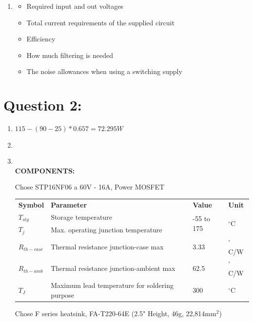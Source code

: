 \documentclass[11pt]{article}
\newcommand\Item[1][]{%
  \ifx\relax#1\relax  \item \else \item[#1] \fi
  \abovedisplayskip=0pt\abovedisplayshortskip=0pt~\vspace*{-\baselineskip}}
\begin{document}
\begin{preview}
\begin{enumerate}[label=\alph*)]
          \item \begin{itemize}
            \item Required input and out voltages
            \item Total current requirements of the supplied circuit
            \item Efficiency
            \item How much filtering is needed
            \item The noise allowances when using a switching supply 
          \end{itemize}
\end{enumerate}

\section*{Question 2:}
\begin{enumerate}[label=\alph*)]
          \item $115-(90-25)*0.657=72.295W$
          \Item \\ 
          \textbf{COMPONENTS:}

          Chose STP16NF06 a 60V - 16A, Power MOSFET\\
          \begin{tabular}{llll}
            \textbf{Symbol} & \textbf{Parameter}                                  & \textbf{Value}              & \textbf{Unit}              \\
            $T_{stg}$           & Storage temperature                             & \multirow{2}{*}{-55 to 175} & \multirow{2}{*}{$^\circ$C} \\
            $T_{j}$             & Max. operating junction temperature             &                             &                            \\
            $R_{th-case}$        & Thermal resistance junction-case max           & 3.33                        & $^\circ$C/W                \\
            $R_{th-amb}$         & Thermal resistance junction-ambient max        & 62.5                        & $^\circ$C/W                \\
            $T_{J}$              & Maximum lead temperature for soldering purpose & 300                         & $^\circ$C                     
          \end{tabular} 

          Chose F series heatsink, FA-T220-64E (2.5" Height, 46g, 22,814mm$^2$) \\


\end{enumerate}
\end{preview}
\end{document}
